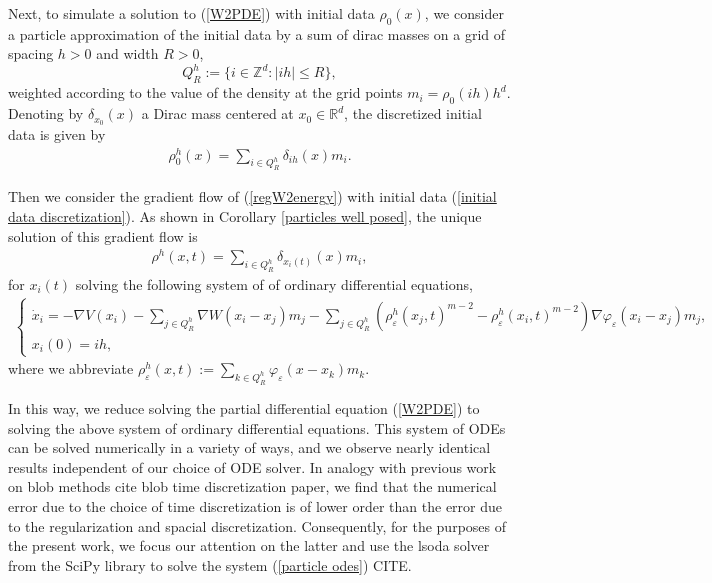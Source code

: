 \documentclass[11pt,leqno]{amsart}
\theoremstyle{definition}
\newcommand{\Rd}{{\mathord{\mathbb R}^d}}
\newcommand{\grad}{\nabla}
\def\epsilon{\varepsilon}
\def\e{\varepsilon}
\begin{document}
Next, to simulate a solution to (\ref{W2PDE}) with initial data $\rho_0(x)$, we consider a particle approximation of the initial data by a sum of dirac masses on a grid of spacing $h >0$ and width $R>0$, 
\[ Q_R^h := \{ i \in \mathbb{Z}^d  : |ih| \leq R \} , \] weighted according to the value of the density at the grid points $m_i = \rho_0(ih)h^d $. Denoting by $\delta_{x_0}(x)$ a Dirac mass centered at $x_0 \in \Rd$, the discretized initial data is given by
\begin{align} \label{initial data discretization}
\rho_0^h(x) = \sum_{i \in Q_R^h} \delta_{ih}(x) m_i.
\end{align}

Then we consider the gradient flow of (\ref{regW2energy}) with initial data (\ref{initial data discretization}). As shown in Corollary \ref{particles well posed}, the unique solution of this gradient flow is
\begin{align} \label{particle gradient flow solution}
\rho^h(x,t) = \sum_{i \in Q_R^h} \delta_{x_i(t)}(x) m_i,
\end{align}
for $x_i(t)$ solving the following system of of ordinary differential equations,
\begin{align} \label{particle odes}
\begin{cases}
\dot{x}_i = - \grad V(x_i) - \sum_{j \in Q_R^h} \grad W(x_i - x_j) m_j  - \sum_{j \in Q_R^h}   \left( \rho_\epsilon^h(x_j,t)^{m-2} -  \rho_\epsilon^h(x_i,t)^{m-2}  \right) \grad \varphi_\e(x_i - x_j) m_j  , \\
x_i(0) = ih ,
\end{cases}
\end{align}
where we abbreviate $\rho_\epsilon^h(x,t) := \sum_{k \in Q_R^h}\varphi_\e(x - x_k) m_k$.


In this way, we reduce solving the partial differential equation (\ref{W2PDE}) to solving the above system of ordinary differential equations. This system of ODEs can be solved numerically in a variety of ways, and we observe nearly identical results independent of our choice of ODE solver. In analogy with previous work on blob methods {\color{Aquamarine} cite blob time discretization paper}, we find that the numerical error due to the choice of time discretization is of lower order than the error due to the regularization and spacial discretization. Consequently, for the purposes of the present work, we focus our attention on the latter and use the {\color{Aquamarine} lsoda solver from the SciPy library to solve the system (\ref{particle odes}) CITE.}
\end{document}
